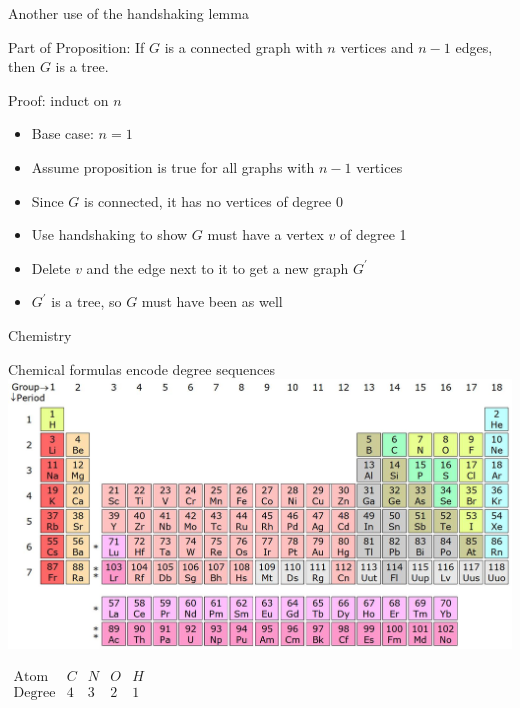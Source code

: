 \documentclass{beamer}
\begin{document}
\begin{frame}{Another use of the handshaking lemma}
  \begin{block}{Part of Proposition:}
    If $G$ is a connected graph with $n$ vertices and $n-1$ edges, then $G$ is a tree.
  \end{block}
  \begin{block}{Proof: induct on $n$}
    \begin{itemize}
    \item Base case: $n=1$
    \item Assume proposition is true for all graphs with $n-1$ vertices
    \item Since $G$ is connected, it has no vertices of degree 0
    \item Use handshaking to show $G$ must have a vertex $v$ of degree 1
    \item Delete $v$ and the edge next to it to get a new graph $G^\prime$
    \item $G^\prime$ is a tree, so $G$ must have been as well
    \end{itemize}
  \end{block}
  \end{frame}

\begin{frame}[plain,c]

\begin{center}

\Huge

Chemistry
\end{center}

\end{frame}


\begin{frame}{Chemical formulas encode degree sequences}
\includegraphics[width=\textwidth]{Pictures/periodictablebig.jpg}
\begin{center} $\begin{array}{c|cccc}
  \text{Atom} & C & N & O & H \\ \hline 
  \text{Degree} & 4 & 3 & 2 & 1
  \end{array}$ \end{center}
\end{frame}
\end{document}
